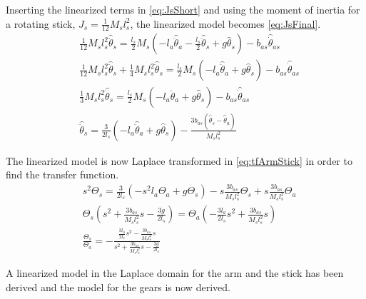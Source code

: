 		Inserting the linearized terms in \autoref{eq:JsShort} and using the moment of inertia for a rotating stick, $J_s=\frac{1}{12}M_sl_s^2$, the linearized model becomes \eqref{eq:JsFinal}.
		\begin{subequations}
			\begin{flalign}
				& \frac{1}{12}M_sl_s^2\hat{\ddot{\theta}}_s=\frac{l_s}{2}M_s\left(-l_a\hat{\ddot{\theta}}_a-\frac{l_s}{2}\hat{\ddot{\theta}}_s+g\hat{\theta}_s\right)-b_{as}\hat{\dot{\theta}}_{as}   \\
				& \frac{1}{12}M_sl_s^2\hat{\ddot{\theta}}_s+\frac{1}{4}M_sl_s^2\hat{\ddot{\theta}}_s=\frac{l_s}{2}M_s\left(-l_a\hat{\ddot{\theta}}_a+g\hat{\theta}_s\right)-b_{as}\hat{\dot{\theta}}_{as}   \\
				& \frac{1}{3}M_sl_s^2\hat{\ddot{\theta}}_s=\frac{l_s}{2}M_s\left(-l_a\hat{\ddot{\theta}}_a+g\hat{\theta}_s\right)-b_{as}\hat{\dot{\theta}}_{as}  \label{eq:TauSmLin} \\
				& \hat{\ddot{\theta}}_s=\frac{3}{2l_s}\left(-l_a\hat{\ddot{\theta}}_a+g\hat{\theta}_s\right)-\frac{3b_{as}\left(\hat{\dot{\theta}}_s-\hat{\dot{\theta}}_a\right)}{M_sl_s^2} \label{eq:JsFinal}
			\end{flalign}
		\end{subequations}
		
		The linearized model is now Laplace transformed in \autoref{eq:tfArmStick} in order to find the transfer function.
		\begin{subequations}
			\begin{flalign}
				& s^2\Theta_s=\frac{3}{2l_s}\left(-s^2l_a\Theta_a+g\Theta_s\right)-s\frac{3b_{as}}{M_sl_s^2}\Theta_s+s\frac{3b_{as}}{M_sl_s^2}\Theta_a  \\
				& \Theta_s\left(s^2+\frac{3b_{as}}{M_sl_s^2}s-\frac{3g}{2l_s}\right)=\Theta_a\left(-\frac{3l_a}{2l_s}s^2+\frac{3b_{as}}{M_sl_s^2}s\right)  \\
				& \frac{\Theta_s}{\Theta_a}=-\frac{\frac{3l_a}{2l_s}s^2-\frac{3b_{as}}{M_sl_s^2}s}{s^2+\frac{3b_{as}}{M_sl_s^2}s-\frac{3g}{2l_s}} \label{eq:tfArmStick}
			\end{flalign}
		\end{subequations}
		
		A linearized model in the Laplace domain for the arm and the stick has been derived and the model for the gears is now derived.



